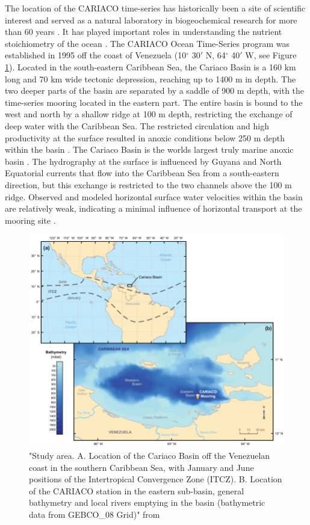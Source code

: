 The location of the CARIACO time-series has historically been a site of scientific interest and served as a natural laboratory in biogeochemical research for more than 60 years \citep{Muller-Karger2019a}. It has played important roles in understanding the nutrient stoichiometry of the ocean \citep{Redfield1963}. The CARIACO Ocean Time-Series program was established in 1995 off the coast of Venezuela (10$^\circ$ 30$'$ N, 64$^\circ$ 40$'$ W, see Figure \ref{CARIACO-map}). Located in the south-eastern Caribbean Sea, the Cariaco Basin is a 160 km long and 70 km wide tectonic depression, reaching up to 1400 m in depth. The two deeper parts of the basin are separated by a saddle of 900 m depth, with the time-series mooring located in the eastern part. The entire basin is bound to the west and north by a shallow ridge at 100 m depth, restricting the exchange of deep water with the Caribbean Sea. The restricted circulation and high productivity at the surface resulted in anoxic conditions below 250 m depth within the basin \citep{Richards1956}. The Cariaco Basin is the worlds largest truly marine anoxic basin \citep{Wakeham2012}. The hydrography at the surface is influenced by Guyana and North Equatorial currents that flow into the Caribbean Sea from a south-eastern direction, but this exchange is restricted to the two channels above the 100 m ridge. Observed and modeled horizontal surface water velocities within the basin are relatively weak, indicating a minimal influence of horizontal transport at the mooring site \citep{Alvera-Azcarate2009}. 

\begin{figure}
\centering
\includegraphics[trim = 0mm 0mm 0mm 0mm, clip, width=1.\linewidth]{./Chp1-Intro/CARIACObasinMAP_Bringueetal2018.png}
\caption[Scheme]{\small {"Study area. A. Location of the Cariaco Basin off the Venezuelan coast in the southern Caribbean Sea, with January and June positions of the Intertropical Convergence Zone (ITCZ). B. Location of the CARIACO station in the eastern sub-basin, general bathymetry and local rivers emptying in the basin (bathymetric data from GEBCO\_08 Grid)" from \cite{Bringue2019}}}
\label{CARIACO-map}
\end{figure}




